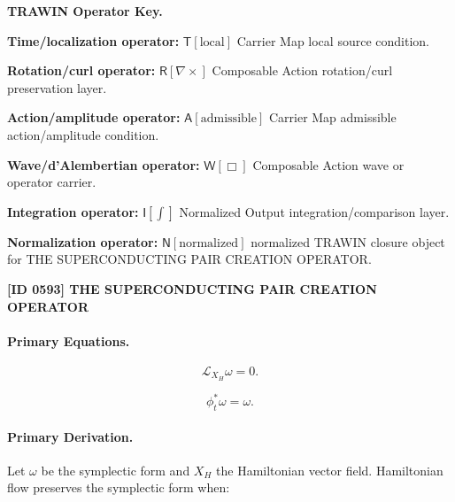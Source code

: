 \par\vspace{0.45\baselineskip}
\noindent\begin{minipage}[t]{\linewidth}
\begingroup
\small
\raggedright
\textbf{TRAWIN Operator Key.}\par
\noindent\textbf{Time/localization operator:} $\mathsf{T}\!\left[\mathrm{local}\right]$ Carrier Map local source condition.\par
\noindent\textbf{Rotation/curl operator:} $\mathsf{R}\!\left[\nabla\times\right]$ Composable Action rotation/curl preservation layer.\par
\noindent\textbf{Action/amplitude operator:} $\mathsf{A}\!\left[\mathrm{admissible}\right]$ Carrier Map admissible action/amplitude condition.\par
\noindent\textbf{Wave/d'Alembertian operator:} $\mathsf{W}\!\left[\Box\right]$ Composable Action wave or operator carrier.\par
\noindent\textbf{Integration operator:} $\mathsf{I}\!\left[\int\right]$ Normalized Output integration/comparison layer.\par
\noindent\textbf{Normalization operator:} $\mathsf{N}\!\left[\mathrm{normalized}\right]$ normalized TRAWIN closure object for THE SUPERCONDUCTING PAIR CREATION OPERATOR.\par
\endgroup
\end{minipage}

\clearpage
\noindent\textbf{[ID 0593] THE SUPERCONDUCTING PAIR CREATION OPERATOR}\par
\vspace{0.35em}
\paragraph{Primary Equations.}
\begin{equation}
\mathcal{L}_{X_H}\omega=0.
\end{equation}

\begin{equation}
\phi_t^{*}\omega=\omega.
\end{equation}

\paragraph{Primary Derivation.}
Let $\omega$ be the symplectic form and $X_H$ the Hamiltonian vector field.  
Hamiltonian flow preserves the symplectic form when:

